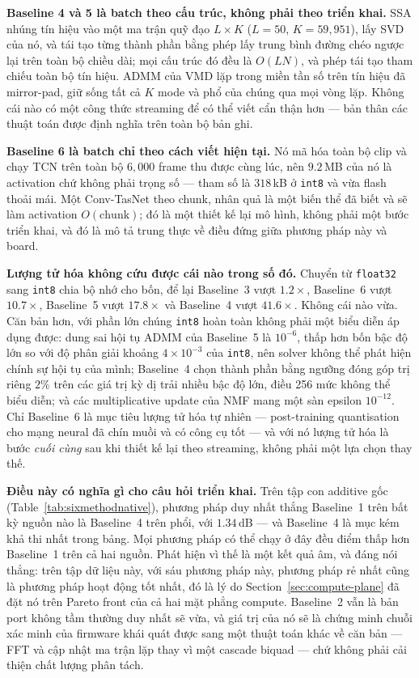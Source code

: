 \documentclass[11pt]{article}
\begin{document}
\textbf{Baseline 4 và 5 là batch theo cấu trúc, không phải theo triển
khai.} SSA nhúng tín hiệu vào một ma trận quỹ đạo $L \times K$ ($L{=}50$,
$K{=}59{,}951$), lấy SVD của nó, và tái tạo từng thành phần bằng phép lấy
trung bình đường chéo ngược lại trên toàn bộ chiều dài; mọi cấu trúc đó
đều là $O(LN)$, và phép tái tạo tham chiếu toàn bộ tín hiệu. ADMM của VMD
lặp trong miền tần số trên tín hiệu đã mirror-pad, giữ sống tất cả $K$
mode và phổ của chúng qua mọi vòng lặp. Không cái nào có một công thức
streaming để có thể viết cẩn thận hơn --- bản thân các thuật toán được
định nghĩa trên toàn bộ bản ghi.

\textbf{Baseline 6 là batch chỉ theo cách viết hiện tại.} Nó mã hóa toàn
bộ clip và chạy TCN trên toàn bộ $6{,}000$ frame thu được cùng lúc, nên
$9.2$\,MB của nó là activation chứ không phải trọng số --- tham số là
$318$\,kB ở \texttt{int8} và vừa flash thoải mái. Một Conv-TasNet theo
chunk, nhân quả là một biến thể đã biết và sẽ làm activation
$O(\text{chunk})$; đó là một thiết kế lại mô hình, không phải một bước
triển khai, và đó là mô tả trung thực về điều đứng giữa phương pháp này
và board.

\textbf{Lượng tử hóa không cứu được cái nào trong số đó.} Chuyển từ
\texttt{float32} sang \texttt{int8} chia bộ nhớ cho bốn, để lại Baseline~3
vượt $1.2\times$, Baseline~6 vượt $10.7\times$, Baseline~5 vượt
$17.8\times$ và Baseline~4 vượt $41.6\times$. Không cái nào vừa. Căn bản
hơn, với phần lớn chúng \texttt{int8} hoàn toàn không phải một biểu diễn
áp dụng được: dung sai hội tụ ADMM của Baseline~5 là $10^{-6}$, thấp hơn
bốn bậc độ lớn so với độ phân giải khoảng $4 \times 10^{-3}$ của
\texttt{int8}, nên solver không thể phát hiện chính sự hội tụ của mình;
Baseline~4 chọn thành phần bằng ngưỡng đóng góp trị riêng $2\%$ trên các
giá trị kỳ dị trải nhiều bậc độ lớn, điều 256 mức không thể biểu diễn; và
các multiplicative update của NMF mang một sàn epsilon $10^{-12}$. Chỉ
Baseline~6 là mục tiêu lượng tử hóa tự nhiên --- post-training
quantisation cho mạng neural đã chín muồi và có công cụ tốt --- và với nó
lượng tử hóa là bước \emph{cuối cùng} sau khi thiết kế lại theo streaming,
không phải một lựa chọn thay thế.

\textbf{Điều này có nghĩa gì cho câu hỏi triển khai.} Trên tập con
additive gốc (Table~\ref{tab:sixmethodnative}), phương pháp duy nhất
thắng Baseline~1 trên bất kỳ nguồn nào là Baseline~4 trên phổi, với
$1.34$\,dB --- và Baseline~4 là mục kém khả thi nhất trong bảng. Mọi
phương pháp có thể chạy ở đây đều điểm thấp hơn Baseline~1 trên cả hai
nguồn. Phát hiện vì thế là một kết quả âm, và đáng nói thẳng: trên tập dữ
liệu này, với sáu phương pháp này, phương pháp rẻ nhất cũng là phương
pháp hoạt động tốt nhất, đó là lý do Section~\ref{sec:compute-plane} đã
đặt nó trên Pareto front của cả hai mặt phẳng compute. Baseline~2 vẫn là
bản port không tầm thường duy nhất sẽ vừa, và giá trị của nó sẽ là chứng
minh chuỗi xác minh của firmware khái quát được sang một thuật toán khác
về căn bản --- FFT và cập nhật ma trận lặp thay vì một cascade biquad ---
chứ không phải cải thiện chất lượng phân tách.
\end{document}
